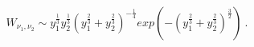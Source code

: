 \begin{equation}
W_{\nu_1,\nu_2}\sim y_1^\frac{1}{3} y_2^\frac{1}{3} (y_1^\frac{2}{3} +y_2^\frac{2}{3})^{-\frac{1}{4}} exp(-(y_1^\frac{2}{3} +y_2^\frac{2}{3})^\frac{3}{2})~.
\end{equation}

